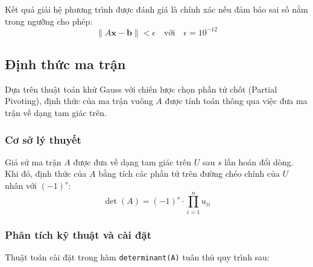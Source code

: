 \documentclass[12pt,a4paper]{article}
\begin{document}
\begin{infobox}
Kết quả giải hệ phương trình được đánh giá là chính xác nếu đảm bảo sai số nằm trong ngưỡng cho phép:
\begin{equation}
\lVert A\mathbf{x} - \mathbf{b} \rVert < \epsilon \quad \text{với} \quad \epsilon = 10^{-12}
\end{equation}
\end{infobox}


\subsection{Định thức ma trận}
Dựa trên thuật toán khử Gauss với chiến lược chọn phần tử chốt (Partial Pivoting), định thức của ma trận vuông $A$ được tính toán thông qua việc đưa ma trận về dạng tam giác trên.

\subsubsection{Cơ sở lý thuyết}
\begin{infobox}
Giả sử ma trận $A$ được đưa về dạng tam giác trên $U$ sau $s$ lần hoán đổi dòng. Khi đó, định thức của $A$ bằng tích các phần tử trên đường chéo chính của $U$ nhân với $(-1)^s$:
\begin{equation}
\det(A) = (-1)^s \cdot \prod_{i=1}^{n} u_{ii}
\end{equation}
\end{infobox}

\subsubsection{Phân tích kỹ thuật và cài đặt}
Thuật toán cài đặt trong hàm \texttt{determinant(A)} tuân thủ quy trình sau:
\end{document}
